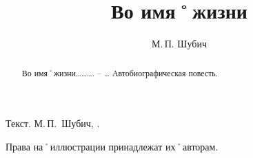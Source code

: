 ﻿%
\title{\huge\bf Во имя˚жизни}										%
\author{\LARGE М.\,П. Шубич}											%

\maketitle																			%


\abstractstyle{\footnotesize}
{\item Текст. М.\,П.~Шубич, \theyear.\\ 
\item Права на˚иллюстрации принадлежат их˚авторам.}

\begin{abstract}
	 {Во имя˚жизни………. \--- …}
	Автобиографическая повесть.
\end{abstract}


\setcounter{page}{3}										%